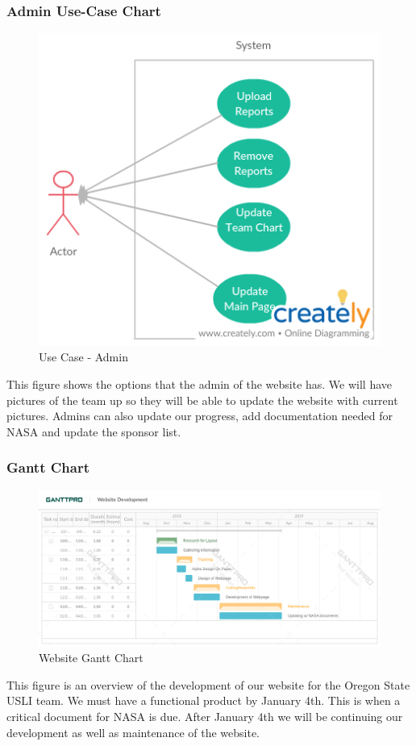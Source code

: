 \documentclass[onecolumn, draftclsnofoot, 10pt, compsoc]{IEEEtran}
\begin{document}
\subsubsection{Admin Use-Case Chart}
\begin{figure}[!htp]
    \centering
    \includegraphics[width = 1 \textwidth,angle=0]{Figures/Admin_User_Use_Case.png}
    \caption{Use Case - Admin}
    \label{fig:my_label}
\end{figure}
This figure shows the options that the admin of the website has. We will have pictures of the team up so they will be able to update the website with current pictures. Admins can also update our progress, add documentation needed for NASA and update the sponsor list. 

\newpage
\subsubsection{Gantt Chart}
\begin{figure}[!htp]
    \centering
    \includegraphics[width = 1 \textwidth,angle=0]{Figures/WebsiteDevelopment.png}
    \caption{Website Gantt Chart}
    \label{fig:my_label}
\end{figure}
This figure is an overview of the development of our website for the Oregon State USLI team. We must have a functional product by January 4th. This is when a critical document for NASA is due. After January 4th we will be continuing our development as well as maintenance of the website.  
\end{document}
